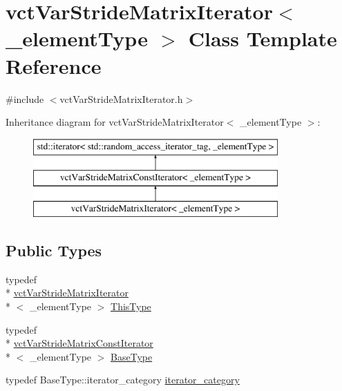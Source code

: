 \hypertarget{classvct_var_stride_matrix_iterator}{\section{vct\-Var\-Stride\-Matrix\-Iterator$<$ \-\_\-element\-Type $>$ Class Template Reference}
\label{classvct_var_stride_matrix_iterator}
}


{\ttfamily \#include $<$vct\-Var\-Stride\-Matrix\-Iterator.\-h$>$}

Inheritance diagram for vct\-Var\-Stride\-Matrix\-Iterator$<$ \-\_\-element\-Type $>$\-:\begin{figure}[H]
\begin{center}
\leavevmode
\includegraphics[height=3.000000cm]{da/d89/classvct_var_stride_matrix_iterator}
\end{center}
\end{figure}
\subsection*{Public Types}
\begin{DoxyCompactItemize}
\item 
typedef \\*
\hyperlink{classvct_var_stride_matrix_iterator}{vct\-Var\-Stride\-Matrix\-Iterator}\\*
$<$ \-\_\-element\-Type $>$ \hyperlink{classvct_var_stride_matrix_iterator_a70b8fef02244dad380a0836d86afdd3e}{This\-Type}
\item 
typedef \\*
\hyperlink{classvct_var_stride_matrix_const_iterator}{vct\-Var\-Stride\-Matrix\-Const\-Iterator}\\*
$<$ \-\_\-element\-Type $>$ \hyperlink{classvct_var_stride_matrix_iterator_adfcc105f210fef52621dd5ea9fe8b937}{Base\-Type}
\item 
typedef Base\-Type\-::iterator\-\_\-category \hyperlink{classvct_var_stride_matrix_iterator_a4666721e510380bfb3c0947d8d37eab9}{iterator\-\_\-category}
\end{DoxyCompactItemize}
